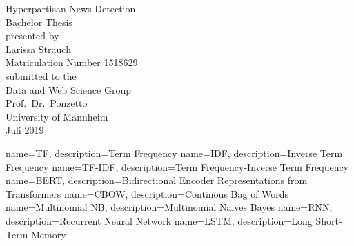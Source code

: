\documentclass[a4paper, 11pt,titlepage,oneside,openany]{book}
\begin{document}
\begin{titlepage}
	\vspace*{2cm}
  \begin{center}
   {\Large Hyperpartisan News Detection\\}
   \vspace{2cm} 
   {Bachelor Thesis\\}
   \vspace{2cm}
   {presented by\\
    Larissa Strauch \\
    Matriculation Number 1518629\\
   }
   \vspace{1cm} 
   {submitted to the\\
    Data and Web Science Group\\
    Prof.\ Dr.\ Ponzetto\\
    University of Mannheim\\} \vspace{2cm}
   {Juli 2019}
  \end{center}
\end{titlepage} 

\tableofcontents
\newpage

\listofalgorithms
\listoffigures

\listoftables

{
	name=TF,
	description={Term Frequency}
}
{
	name=IDF,
	description={Inverse Term Frequency}
}
{
	name=TF-IDF,
	description={Term Frequency-Inverse Term Frequency}
}
{
	name=BERT,
	description={Bidirectional Encoder Representations from Transformers}
}
{
	name=CBOW,
	description={Continous Bag of Words}
}
{
	name=Multinomial NB,
	description={Multinomial Naives Bayes}
}
{
	name=RNN,
	description={Recurrent Neural Network}
}
{
	name=LSTM,
	description={Long Short-Term Memory}
}


\printglossaries %


\newpage


\end{document}
